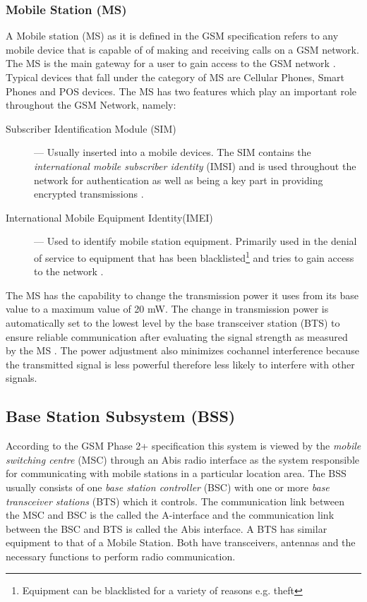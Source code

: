 \subsubsection{Mobile Station (MS)}
A Mobile station (MS) as it is defined in the GSM specification refers to any mobile device that is capable of of making and receiving calls on a GSM network.  The MS is the main gateway 
for a user to gain access to the GSM network \cite{Eisenblatter,GSMArchitectureProtocolsServices}. Typical devices that fall under the category of MS are Cellular Phones, Smart Phones and POS devices. The MS has two features which play an important role throughout the GSM Network, namely:
\begin{description}
\item[Subscriber Identification Module (SIM)] --- Usually inserted into a mobile devices. The SIM contains the \emph{international mobile subscriber identity} (IMSI) and is used throughout the network for authentication as well as being a key part in providing encrypted transmissions \cite{Eisenblatter}.
\item[International Mobile Equipment Identity(IMEI)] --- Used to identify mobile station equipment. Primarily used in the denial of service to equipment that has been blacklisted\footnote{Equipment can be blacklisted for a variety of reasons e.g. theft} and tries to gain access to the network \cite{Eisenblatter}.
\end{description}
The MS has the capability to change the transmission power it uses from its base value to a maximum value of 20 mW. The change in transmission power is automatically set to the lowest level by the base transceiver station (BTS) to ensure reliable communication after evaluating the signal strength as measured by the MS \cite{GSMSysEngin,GSMArchitectureProtocolsServices}. The power adjustment also minimizes cochannel interference because the transmitted signal is less powerful therefore less likely to interfere with other signals\cite{GSMSysEngin}.

\subsection{Base Station Subsystem (BSS)}

According to the GSM Phase 2+ specification this system is viewed by the \emph{mobile switching centre} (MSC) through an Abis radio interface as the system responsible for communicating with mobile stations in a particular location area. The BSS usually consists of one \emph{base station controller} (BSC) with one or more \emph{base transceiver stations} (BTS) which it controls. The communication link between the MSC and BSC is the called the A-interface and the communication link between the BSC and BTS is called the Abis interface. A BTS has similar equipment to that of a Mobile Station. Both have transceivers, antennas and the necessary functions to perform radio communication. 

